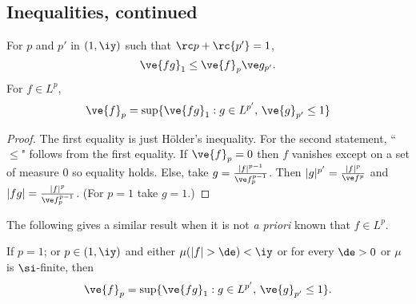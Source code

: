 
\subsection{Inequalities, continued}
\begin{thm}\label{fpsup}
For $p$ and $p'$ in $(1,\iy)$ such that $\rc p+\rc{p'}=1$,
\[\ve{fg}_1\le \ve{f}_p\ve g_{p'}.\]
For $f\in L^p$,
\[
\ve{f}_p=\sup\{
\ve{fg}_1:g\in L^{p'},\,\ve{g}_{p'}\le 1
\}
\]
\end{thm}
\begin{proof}
The first equality is just H\"older's inequality. 
For the second statement, ``$\le$" follows from the first equality. If $\ve{f}_p=0$ then $f$ vanishes except on a set of measure 0 so equality holds. Else, take $g=\frac{|f|^{p-1}}{\ve f_p^{p-1}}$. Then $|g|^{p'}=\frac{|f|^p}{\ve f^p}$ and $|fg|=\frac{|f|^p}{\ve f_p^{p-1}}$. 
(For $p=1$ take $g=1$.)
\end{proof}
The following gives a similar result when it is not {\it a priori} known that $f\in L^p$.
\begin{thm}
If $p=1$; or $p\in (1,\iy)$ and either $\mu(|f|>\de)<\iy$ or for every $\de>0$ or $\mu$ is $\si$-finite, then
\[
\ve{f}_p=\sup\{
\ve{fg}_1:g\in L^{p'},\,\ve{g}_{p'}\le 1
\}.
\]
\end{thm}
